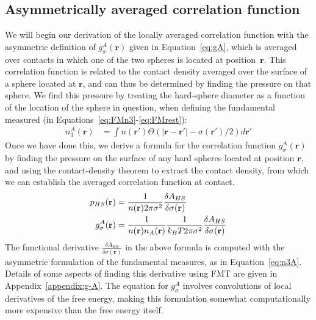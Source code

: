 \documentclass[letterpaper,twocolumn,amsmath,amssymb,jcp,10pt,aip]{revtex4-1}
\newcommand{\rr}{\textbf{r}}
\begin{document}
\subsection{Asymmetrically averaged correlation function}\label{sec:g-A}

We will begin our derivation of the locally averaged correlation
function with the asymmetric definition of $g_\sigma^A(\rr)$ given in
Equation~\ref{eq:gA}, which is averaged over contacts in which one of
the two spheres is located at position~$\rr$.  This correlation
function is related to the contact density averaged over the surface
of a sphere located at $\rr$, and can thus be determined by finding
the pressure on that sphere.  We find this pressure by treating the
hard-sphere diameter as a function of the location of the sphere in
question, when defining the fundamental measured (in
Equations~\ref{eq:FMn3}-\ref{eq:FMrest}):
\begin{align}
  n_3^A(\rr) &= \int n(\rr')\Theta(|\rr-\rr'|-\sigma(\rr')/2)d\rr' \label{eq:n3A}
\end{align}
Once we have done this, we derive a formula for the correlation
function $g_\sigma^A(\rr)$ by finding the pressure on the surface of
any hard spheres located at position $\rr$, and using the
contact-density theorem to extract the contact density, from which we
can establish the averaged correlation function at contact.
\begin{align}
  p_{HS}(\mathbf{r}) &= \frac{1}{n(\rr) 2\pi \sigma^2} \frac{\delta
    A_{HS}}{\delta \sigma(\mathbf{r})} \label{eq:p_{HS}^A}\\
  g_\sigma^A(\rr)%
  &= \frac{1}{n(\rr) n_A(\rr)}\frac{1}{ k_BT 2\pi \sigma^2} \frac{\delta
    A_{HS}}{\delta \sigma(\mathbf{r})} \label{eq:g-A-exact}
\end{align}
The functional derivative $\frac{\delta A_{HS}}{\delta
  \sigma(\mathbf{r})}$ in the above formula is computed with the
asymmetric formulation of the fundamental measures, as in
Equation~\ref{eq:n3A}.  Details of some aspects of finding this
derivative using FMT are given in Appendix~\ref{appendix:g-A}.  The
equation for $g_\sigma^A$ involves convolutions of local derivatives
of the free energy, making this formulation somewhat computationally
more expensive than the free energy itself.
\end{document}
